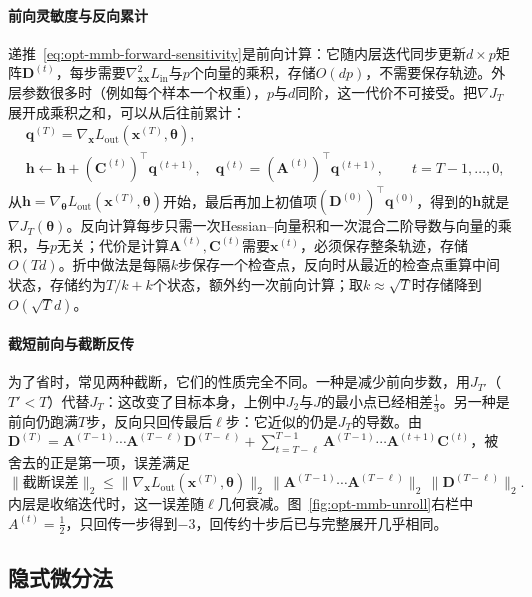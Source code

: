 \paragraph{前向灵敏度与反向累计}
递推~\eqref{eq:opt-mmb-forward-sensitivity}是前向计算：它随内层迭代同步更新$d\times p$矩阵$\bm D^{(t)}$，每步需要$\nabla^2_{\bm x\bm x}L_{\mathrm{in}}$与$p$个向量的乘积，存储$O(dp)$，不需要保存轨迹。外层参数很多时（例如每个样本一个权重），$p$与$d$同阶，这一代价不可接受。把$\nabla J_T$展开成乘积之和，可以从后往前累计：
\begin{equation}
\label{eq:opt-mmb-reverse}
\begin{aligned}
&\bm q^{(T)}=\nabla_{\bm x}L_{\mathrm{out}}(\bm x^{(T)},\bm\theta),\\
&\bm h\gets\bm h+(\bm C^{(t)})^\top\bm q^{(t+1)},\quad
\bm q^{(t)}=(\bm A^{(t)})^\top\bm q^{(t+1)},\qquad t=T-1,\dots,0,
\end{aligned}
\end{equation}
从$\bm h=\nabla_{\bm\theta}L_{\mathrm{out}}(\bm x^{(T)},\bm\theta)$开始，最后再加上初值项$(\bm D^{(0)})^\top\bm q^{(0)}$，得到的$\bm h$就是$\nabla J_T(\bm\theta)$。反向计算每步只需一次Hessian--向量积和一次混合二阶导数与向量的乘积，与$p$无关；代价是计算$\bm A^{(t)},\bm C^{(t)}$需要$\bm x^{(t)}$，必须保存整条轨迹，存储$O(Td)$。折中做法是每隔$k$步保存一个检查点，反向时从最近的检查点重算中间状态，存储约为$T/k+k$个状态，额外约一次前向计算；取$k\approx\sqrt T$时存储降到$O(\sqrt Td)$。

\paragraph{截短前向与截断反传}
为了省时，常见两种截断，它们的性质完全不同。一种是减少前向步数，用$J_{T'}$（$T'<T$）代替$J_T$：这改变了目标本身，上例中$J_2$与$J$的最小点已经相差$\frac13$。另一种是前向仍跑满$T$步，反向只回传最后$\ell$步：它近似的仍是$J_T$的导数。由$\bm D^{(T)}=\bm A^{(T-1)}\cdots\bm A^{(T-\ell)}\bm D^{(T-\ell)}+\sum_{t=T-\ell}^{T-1}\bm A^{(T-1)}\cdots\bm A^{(t+1)}\bm C^{(t)}$，被舍去的正是第一项，误差满足
\[
\lVert\text{截断误差}\rVert_2\leq\lVert\nabla_{\bm x}L_{\mathrm{out}}(\bm x^{(T)},\bm\theta)\rVert_2\,\lVert\bm A^{(T-1)}\cdots\bm A^{(T-\ell)}\rVert_2\,\lVert\bm D^{(T-\ell)}\rVert_2.
\]
内层是收缩迭代时，这一误差随$\ell$几何衰减。图~\ref{fig:opt-mmb-unroll}右栏中$A^{(t)}=\frac12$，只回传一步得到$-3$，回传约十步后已与完整展开几乎相同。

\subsection{隐式微分法}
\label{sec:opt-mmb-implicit}

